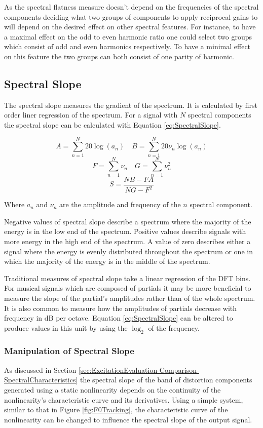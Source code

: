 			As the spectral flatness measure doesn't depend on the frequencies of the spectral components
			deciding what two groups of components to apply reciprocal gains to will depend on the desired
			effect on other spectral features. For instance, to have a maximal effect on the odd to even
			harmonic ratio one could select two groups which consist of odd and even harmonics respectively. To
			have a minimal effect on this feature the two groups can both consist of one parity of harmonic.

	\subsection{Spectral Slope}
	\label{sec:FeatureControl-Parameterisation-Slope}
		The spectral slope measures the gradient of the spectrum. It is calculated by first order liner regression
		of the spectrum. For a signal with $N$ spectral components the spectral slope can be calculated with
		Equation \ref{eq:SpectralSlope}.

		\[ A = \sum_{n = 1}^{N} 20\log (a_{n}) \quad B = \sum_{n = 1}^{N} 20\nu_{n}\log (a_{n}) \]
		\[ F = \sum_{n = 1}^{N} \nu_{n} \quad G = \sum_{n = 1}^{N} \nu_{n}^{2} \]
		\begin{equation}
			S = \frac{NB - FA}
		                 {NG - F^{2}}
			\label{eq:SpectralSlope}
		\end{equation}

		Where $a_{n}$ and $\nu_{n}$ are the amplitude and frequency of the $n$ spectral component.

		Negative values of spectral slope describe a spectrum where the majority of the energy is in the low end of
		the spectrum. Positive values describe signals with more energy in the high end of the spectrum. A value of
		zero describes either a signal where the energy is evenly distributed throughout the spectrum or one in
		which the majority of the energy is in the middle of the spectrum.

		Traditional measures of spectral slope take a linear regression of the DFT bins. For musical signals which
		are composed of partials it may be more beneficial to measure the slope of the partial's amplitudes rather
		than of the whole spectrum. It is also common to measure how the amplitudes of partials decrease with
		frequency in dB per octave. Equation \ref{eq:SpectralSlope} can be altered to produce values in this unit
		by using the $\log_{2}$ of the frequency.
		
		\subsubsection*{Manipulation of Spectral Slope}
			As discussed in Section \ref{sec:ExcitationEvaluation-Comparison-SpectralCharacteristics} the
			spectral slope of the band of distortion components generated using a static nonlinearity depends
			on the continuity of the nonlinearity's characteristic curve and its derivatives. Using a simple
			system, similar to that in Figure \ref{fig:F0Tracking}, the characteristic curve of the
			nonlinearity can be changed to influence the spectral slope of the output signal.

